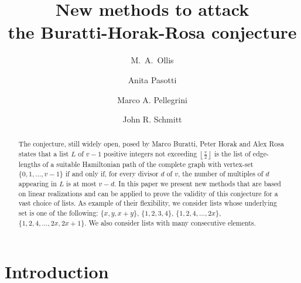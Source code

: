 \documentclass{amsart}
\theoremstyle{definition}
\numberwithin{equation}{section}
\begin{document}
\title[New methods to attack the Buratti-Horak-Rosa conjecture]{New methods to attack \\the Buratti-Horak-Rosa conjecture}

\author{M.~A.~Ollis}
\address{Marlboro Institute for Liberal Arts and Interdisciplinary Studies,
Emerson College,
Boston, MA~02116, USA}

\author{Anita Pasotti}
\address{DICATAM - Sez. Matematica, Universit\`a degli Studi di Brescia,
Via Branze 43,
I~25123 Brescia, Italy}

\author{Marco A. Pellegrini}
\address{Dipartimento di Matematica e Fisica, Universit\`a Cattolica del Sacro Cuore,
Via Musei 41,
I~25121 Brescia, Italy}


\author{John R. Schmitt}
\address{Mathematics Department, Middlebury College, Middlebury, VT~05753, USA}



\begin{abstract}
The conjecture, still widely open, posed by Marco Buratti, Peter Horak and Alex Rosa  states that a list $L$ of $v-1$ positive
integers not exceeding $\left\lfloor \frac{v}{2}\right\rfloor$ is the list of edge-lengths of a suitable
Hamiltonian path of the complete graph with vertex-set $\{0,1,\ldots,v-1\}$ if and only if,
for every divisor $d$ of $v$, the number of multiples of $d$ appearing in $L$
is at most $v-d$.
In this paper we present new methods that are based on linear realizations and can be applied to prove the validity of
this conjecture for a vast choice of lists. As example of their flexibility, we consider  lists whose underlying set
is one of the following: $\{x,y,x+y\}$, $\{1,2,3,4\}$, $\{1,2,4,\ldots,2x\}$, $\{1,2,4,\ldots,2x,2x+1\}$.
We also consider lists with many consecutive elements.
\end{abstract}

 \maketitle


\section{Introduction}
\end{document}
